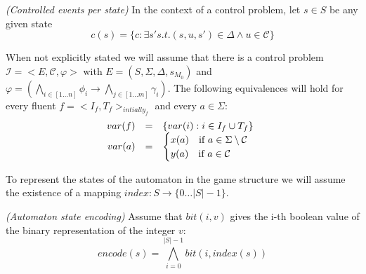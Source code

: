 \begin{definition}\label{def:state-c-events}\emph{(Controlled events per state)}
In the context of a control problem, let $s \in S$ be any given state 
\[c(s) = \{ c: \exists s' s.t. (s,u,s') \in \Delta \wedge u \in \mathcal{C} \}\]
\end{definition}

When not explicitly stated we will
assume that there is a control problem $\mathcal{I}= <E, \mathcal{C}, \varphi>$ with
$E = (S, \Sigma, \Delta, s_{M_0})$ and 
$\varphi = (\bigwedge_{i \in [1 \ldots n]} \phi_i \rightarrow \bigwedge_{j \in [1\ldots m]}\gamma_i)$.
The following equivalences will hold for every fluent
$f = <I_f, T_f>_{intially_f}$ and every $a \in \Sigma$:
\[
\begin{array}{r c l}
var(f) &=& \{ var(i) : i \in I_f \cup T_f \}\\
var(a) &=& 
\begin{cases}
x(a) \quad \text{if } a \in \Sigma \setminus \mathcal{C}\\
y(a) \quad \text{if } a \in \mathcal{C}\\
\end{cases}
\end{array}
\]

To represent the states of the automaton in the game structure
we will assume the existence of a mapping $index : S \rightarrow \{ 0 \ldots |S| -1 \}$.

\begin{definition}\label{def:state-encoding}\emph{(Automaton state encoding)}
Assume that $bit(i, v)$ gives the i-th boolean value of 
the binary representation of the integer $v$:
\[encode(s) = \bigwedge_{i=0}^{|S|-1} bit(i, index(s)) \]
\end{definition}



